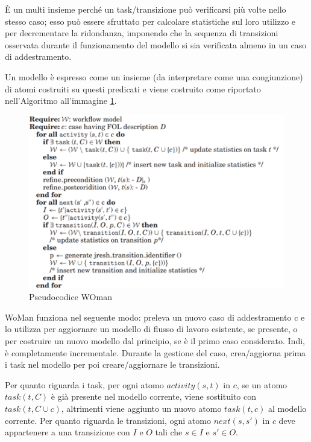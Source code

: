 È un multi insieme perché un task/transizione può verificarsi più volte nello stesso caso; esso può essere sfruttato per calcolare statistiche sul loro utilizzo e per decrementare la ridondanza, imponendo che la sequenza di transizioni osservata durante il funzionamento del modello si sia verificata almeno in un caso di addestramento. 

Un modello è espresso come un insieme (da interpretare come una congiunzione) di atomi costruiti su questi predicati e viene costruito come riportato nell'Algoritmo all'immagine \ref{fig:image18}.

\begin{figure}
    \begin{center}    
        \includegraphics[width=0.9\linewidth]{images/53.png}
        \caption{Pseudocodice WOman}
        \label{fig:image18}
    \end{center}
\end{figure}
 

WoMan funziona nel seguente modo: preleva un nuovo caso di addestramento c e lo utilizza per aggiornare un modello di flusso di lavoro esistente, se presente, o per costruire un nuovo modello dal principio, se è il primo caso considerato. Indi, è completamente incrementale. Durante la gestione del caso, crea/aggiorna prima i task nel modello per poi creare/aggiornare le transizioni. 

Per quanto riguarda i task, per ogni atomo $activity(s, t)$ in $c$, se un atomo $task(t, C)$ è già presente nel modello corrente, viene sostituito con $task(t, C \cup {c})$, altrimenti viene aggiunto un nuovo atomo $task(t, {c})$ al modello corrente. Per quanto riguarda le transizioni, ogni atomo $next(s, s')$ in $c$ deve appartenere a una transizione con $I$ e $O$ tali che $s \in I$ e $s' \in O$.

